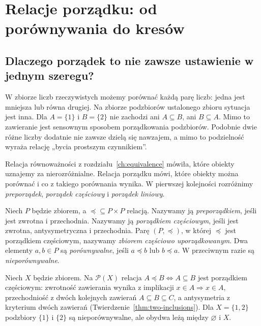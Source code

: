 \chapter{Relacje porządku: od porównywania do kresów}\label{ch:orders}

\section{Dlaczego porządek to nie zawsze ustawienie w jednym szeregu?}
W zbiorze liczb rzeczywistych możemy porównać każdą parę liczb:
jedna jest mniejsza lub równa drugiej. Na zbiorze podzbiorów
ustalonego zbioru sytuacja jest inna. Dla $A=\{1\}$ i $B=\{2\}$
nie zachodzi ani $A\subseteq B$, ani $B\subseteq A$.
Mimo to zawieranie jest sensownym sposobem porządkowania podzbiorów.
Podobnie dwie różne liczby dodatnie nie zawsze dzielą się nawzajem,
a mimo to podzielność wyraża relację „bycia prostszym czynnikiem”.

Relacja równoważności z rozdziału~\ref{ch:equivalence} mówiła,
które obiekty uznajemy za nierozróżnialne. Relacja porządku
mówi, które obiekty można porównać i co z takiego porównania wynika.
W pierwszej kolejności rozróżnimy \emph{preporządek}, \emph{porządek
częściowy} i \emph{porządek liniowy}.

\begin{definicja}\label{def:partial-order}
Niech $P$ będzie zbiorem, a $\preceq\subseteq P\times P$
relacją. Nazywamy ją \emph{preporządkiem}, jeśli jest zwrotna
i przechodnia. Nazywamy ją \emph{porządkiem częściowym}, jeśli
jest zwrotna, antysymetryczna i przechodnia.
Parę $(P,\preceq)$, w której $\preceq$ jest porządkiem
częściowym, nazywamy \emph{zbiorem częściowo uporządkowanym}.
Dwa elementy $a,b\in P$ są \emph{porównywalne}, jeśli
$a\preceq b$ lub $b\preceq a$. W przeciwnym razie są
\emph{nieporównywalne}.
\end{definicja}

\begin{przyklad}\label{ex:order-powerset}
Niech $X$ będzie zbiorem. Na $\mathcal P(X)$ relacja
$A\preceq B\iff A\subseteq B$
jest porządkiem częściowym: zwrotność zawierania wynika
z implikacji $x\in A\Rightarrow x\in A$, przechodniość
z dwóch kolejnych zawierań $A\subseteq B\subseteq C$,
a antysymetria z kryterium dwóch zawierań
(Twierdzenie~\ref{thm:two-inclusions}).
Dla $X=\{1,2\}$ podzbiory $\{1\}$ i $\{2\}$ są
nieporównywalne, ale obydwa leżą między $\varnothing$ i $X$.
\end{przyklad}

